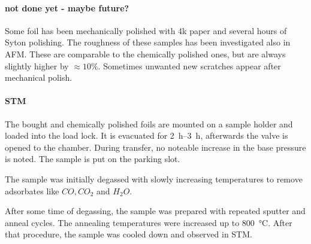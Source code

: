 \paragraph{not done yet - maybe future?}
Some foil has been mechanically polished with 4k paper and several hours of Syton polishing. The roughness of these samples has been investigated also in AFM. These are comparable to the chemically polished ones, but are always slightly higher by $\approx 10\%$. Sometimes unwanted new scratches appear after mechanical polish.

\paragraph{STM}
\label{sec:foil-STM}
The bought and chemically polished foils are mounted on a sample holder and loaded into the load lock. It is evacuated for \SIrange{2}{3}{\hour}, afterwards the valve is opened to the chamber. During transfer, no noteable increase in the base pressure is noted. The sample is put on the parking slot.

The sample was initially degassed with slowly increasing temperatures to remove adsorbates like $CO, CO_2$ and $H_2O$.

After some time of degassing, the sample was prepared with repeated sputter and anneal cycles. The annealing temperatures were increased up to \SI{800}{\degreeCelsius}. 
After that procedure, the sample was cooled down and observed in STM.